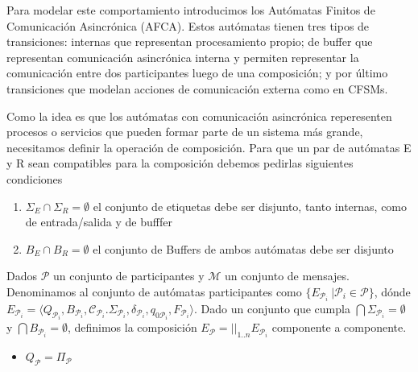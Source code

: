 Para modelar este comportamiento introducimos los Autómatas Finitos de Comunicación Asincrónica (AFCA). Estos autómatas tienen tres tipos de transiciones: internas que representan procesamiento propio; de buffer que representan comunicación asincrónica interna y permiten representar la comunicación entre dos participantes luego de una composición; y por último transiciones que modelan acciones de comunicación externa como en CFSMs.

Como la idea es que los autómatas con comunicación asincrónica reperesenten procesos o servicios que pueden formar parte de un sistema más grande, necesitamos definir la operación de composición. Para que un par de autómatas E y R sean compatibles para la composición debemos pedirlas siguientes condiciones

 \begin{enumerate}
\item $\Sigma_E \cap \Sigma_R = \emptyset$ el conjunto de etiquetas debe ser disjunto, tanto internas, como de entrada/salida y de bufffer
\item $ B_E \cap B_R = \emptyset$ el conjunto de Buffers de ambos autómatas debe ser disjunto  
\end{enumerate}
\begin{definition}
Dados $\mathcal{P}$ un conjunto de participantes y $\mathcal{M}$ un conjunto de mensajes. Denominamos al conjunto de autómatas participantes como $\{E_{\mathcal{P}_i} \ | \mathcal{P}_i \in \mathcal{P}\}$, dónde $E_{\mathcal{P}_i}= \langle Q_{\mathcal{P}_i}, B_{\mathcal{P}_i}, \mathcal{C}_{\mathcal{P}_i}. \Sigma_{\mathcal{P}_i}, \delta_{\mathcal{P}_i}, q_{0{\mathcal{P}_i}}, F_{\mathcal{P}_i}\rangle$. Dado un conjunto que cumpla $\bigcap \Sigma_{\mathcal{P}_i} = \emptyset$ y $\bigcap B_{\mathcal{P}_i} = \emptyset$, definimos la composición $E_\mathcal{P}= ||_{1..n} E_{\mathcal{P}_i}$ componente a componente.
\begin{itemize}
    \item $Q_\mathcal{P}= \Pi_{\mathcal{P}} $
\end{itemize}

\end{definition}
